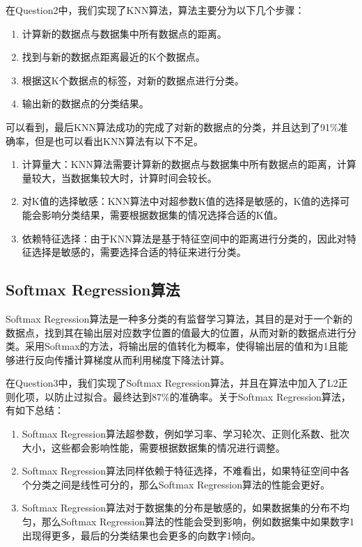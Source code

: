 \documentclass[UTF8]{ctexart}
\begin{document}
\indent 在Question2中，我们实现了KNN算法，算法主要分为以下几个步骤：

\begin{enumerate}
    \item 计算新的数据点与数据集中所有数据点的距离。
    \item 找到与新的数据点距离最近的K个数据点。
    \item 根据这K个数据点的标签，对新的数据点进行分类。
    \item 输出新的数据点的分类结果。
\end{enumerate}

\indent 可以看到，最后KNN算法成功的完成了对新的数据点的分类，并且达到了91\%准确率，但是也可以看出KNN算法有以下不足。

\begin{enumerate}
    \item 计算量大：KNN算法需要计算新的数据点与数据集中所有数据点的距离，计算量较大，当数据集较大时，计算时间会较长。
    \item 对K值的选择敏感：KNN算法中对超参数K值的选择是敏感的，K值的选择可能会影响分类结果，需要根据数据集的情况选择合适的K值。
    \item 依赖特征选择：由于KNN算法是基于特征空间中的距离进行分类的，因此对特征选择是敏感的，需要选择合适的特征来进行分类。
\end{enumerate}

\subsection{Softmax Regression算法}

\indent Softmax Regression算法是一种多分类的有监督学习算法，其目的是对于一个新的数据点，找到其在输出层对应数字位置的值最大的位置，从而对新的数据点进行分类。采用Softmax的方法，将输出层的值转化为概率，使得输出层的值和为1且能够进行反向传播计算梯度从而利用梯度下降法计算。

\indent 在Question3中，我们实现了Softmax Regression算法，并且在算法中加入了L2正则化项，以防止过拟合。最终达到87\%的准确率。关于Softmax Regression算法，有如下总结：

\begin{enumerate}
    \item Softmax Regression算法超参数，例如学习率、学习轮次、正则化系数、批次大小，这些都会影响性能，需要根据数据集的情况进行调整。
    \item Softmax Regression算法同样依赖于特征选择，不难看出，如果特征空间中各个分类之间是线性可分的，那么Softmax Regression算法的性能会更好。
    \item Softmax Regression算法对于数据集的分布是敏感的，如果数据集的分布不均匀，那么Softmax Regression算法的性能会受到影响，例如数据集中如果数字1出现得更多，最后的分类结果也会更多的向数字1倾向。
\end{enumerate}
\end{document}
